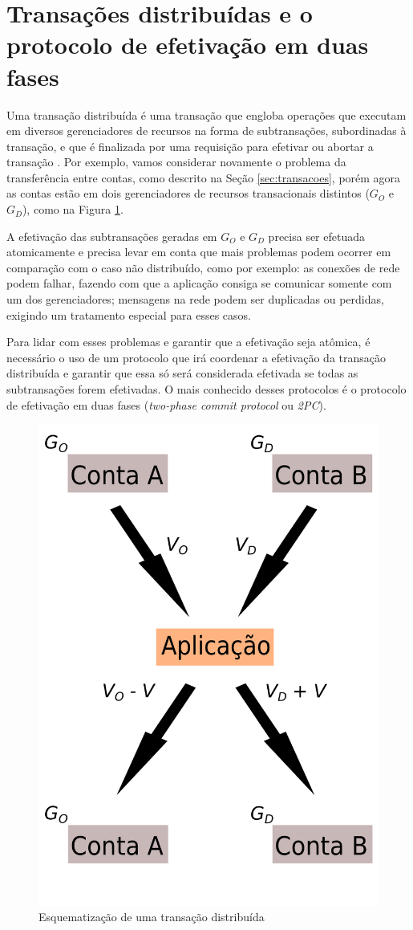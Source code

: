 \documentclass[11pt,twoside,a4paper]{book}
\begin{document}
\section{Transações distribuídas e o protocolo de efetivação em duas fases}
\label{sec:transacoes_distribuidas}
\label{sec:2pc}
Uma transação distribuída é uma transação que engloba operações que executam em diversos gerenciadores de recursos na forma de subtransações, 
subordinadas à transação, e que é finalizada por uma requisição para efetivar ou
abortar a transação \cite{gray-lamport}. Por exemplo, vamos considerar
novamente o problema da transferência entre contas, como descrito na Seção \ref{sec:transacoes}, porém agora as contas estão em dois 
gerenciadores de recursos transacionais distintos ($G_O$ e $G_D$), como na Figura \ref{fig:transacao_distribuida}.

A efetivação das subtransações geradas em $G_O$ e $G_D$ precisa ser efetuada
atomicamente e precisa levar em conta que mais problemas podem ocorrer em
comparação com o caso não distribuído, como por exemplo: as conexões de rede
podem falhar, fazendo com que a aplicação consiga se comunicar somente com um dos gerenciadores; mensagens na rede podem ser duplicadas ou 
perdidas, exigindo um tratamento especial para esses casos.

Para lidar com esses problemas e garantir que a efetivação seja atômica, é necessário o uso de um protocolo que irá coordenar a efetivação da 
transação distribuída e garantir que essa só será considerada efetivada se todas as subtransações forem efetivadas. O mais conhecido desses 
protocolos é o protocolo de efetivação em duas fases (\emph{two-phase commit protocol} ou \emph{2PC}).

\begin{figure}
  \centering
  \includegraphics[width=.40\textwidth]{transacao_distribuida} 
  \caption{Esquematização de uma transação distribuída}
  \label{fig:transacao_distribuida} 
\end{figure}
\end{document}
